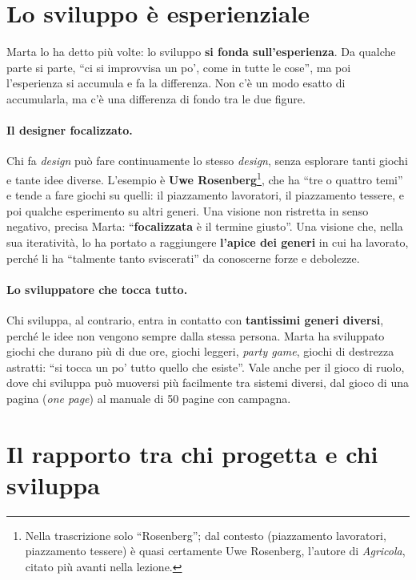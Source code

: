 \section{Lo sviluppo è esperienziale}
\label{a13:sec:esperienza}

Marta lo ha detto più volte: lo sviluppo \textbf{si fonda sull'esperienza}. Da qualche
parte si parte, ``ci si improvvisa un po', come in tutte le cose'', ma poi l'esperienza si
accumula e fa la differenza. Non c'è un modo esatto di accumularla, ma c'è una differenza
di fondo tra le due figure.

\paragraph{Il designer focalizzato.} Chi fa \emph{design} può fare continuamente lo stesso
\emph{design}, senza esplorare tanti giochi e tante idee diverse. L'esempio è \textbf{Uwe
Rosenberg}\footnote{Nella trascrizione solo ``Rosenberg''; dal contesto (piazzamento
lavoratori, piazzamento tessere) è quasi certamente Uwe Rosenberg, l'autore di
\emph{Agricola}, citato più avanti nella lezione.}, che ha ``tre o quattro temi'' e tende
a fare giochi su quelli: il piazzamento lavoratori, il piazzamento tessere, e poi qualche
esperimento su altri generi. Una visione non ristretta in senso negativo, precisa Marta:
``\textbf{focalizzata} è il termine giusto''. Una visione che, nella sua iteratività, lo ha
portato a raggiungere \textbf{l'apice dei generi} in cui ha lavorato, perché li ha
``talmente tanto sviscerati'' da conoscerne forze e debolezze.

\paragraph{Lo sviluppatore che tocca tutto.} Chi sviluppa, al contrario, entra in contatto
con \textbf{tantissimi generi diversi}, perché le idee non vengono sempre dalla stessa
persona. Marta ha sviluppato giochi che durano più di due ore, giochi leggeri,
\emph{party game}, giochi di destrezza astratti: ``si tocca un po' tutto quello che
esiste''. Vale anche per il gioco di ruolo, dove chi sviluppa può muoversi più facilmente
tra sistemi diversi, dal gioco di una pagina (\emph{one page}) al manuale di 50 pagine con
campagna.

\section{Il rapporto tra chi progetta e chi sviluppa}
\label{a13:sec:rapporto}

